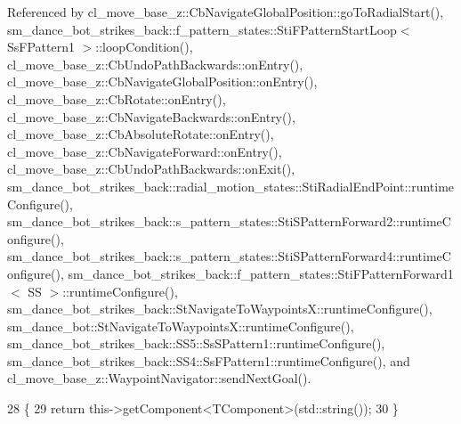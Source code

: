 Referenced by cl\+\_\+move\+\_\+base\+\_\+z\+::\+Cb\+Navigate\+Global\+Position\+::go\+To\+Radial\+Start(), sm\+\_\+dance\+\_\+bot\+\_\+strikes\+\_\+back\+::f\+\_\+pattern\+\_\+states\+::\+Sti\+F\+Pattern\+Start\+Loop$<$ Ss\+F\+Pattern1 $>$\+::loop\+Condition(), cl\+\_\+move\+\_\+base\+\_\+z\+::\+Cb\+Undo\+Path\+Backwards\+::on\+Entry(), cl\+\_\+move\+\_\+base\+\_\+z\+::\+Cb\+Navigate\+Global\+Position\+::on\+Entry(), cl\+\_\+move\+\_\+base\+\_\+z\+::\+Cb\+Rotate\+::on\+Entry(), cl\+\_\+move\+\_\+base\+\_\+z\+::\+Cb\+Navigate\+Backwards\+::on\+Entry(), cl\+\_\+move\+\_\+base\+\_\+z\+::\+Cb\+Absolute\+Rotate\+::on\+Entry(), cl\+\_\+move\+\_\+base\+\_\+z\+::\+Cb\+Navigate\+Forward\+::on\+Entry(), cl\+\_\+move\+\_\+base\+\_\+z\+::\+Cb\+Undo\+Path\+Backwards\+::on\+Exit(), sm\+\_\+dance\+\_\+bot\+\_\+strikes\+\_\+back\+::radial\+\_\+motion\+\_\+states\+::\+Sti\+Radial\+End\+Point\+::runtime\+Configure(), sm\+\_\+dance\+\_\+bot\+\_\+strikes\+\_\+back\+::s\+\_\+pattern\+\_\+states\+::\+Sti\+S\+Pattern\+Forward2\+::runtime\+Configure(), sm\+\_\+dance\+\_\+bot\+\_\+strikes\+\_\+back\+::s\+\_\+pattern\+\_\+states\+::\+Sti\+S\+Pattern\+Forward4\+::runtime\+Configure(), sm\+\_\+dance\+\_\+bot\+\_\+strikes\+\_\+back\+::f\+\_\+pattern\+\_\+states\+::\+Sti\+F\+Pattern\+Forward1$<$ S\+S $>$\+::runtime\+Configure(), sm\+\_\+dance\+\_\+bot\+\_\+strikes\+\_\+back\+::\+St\+Navigate\+To\+Waypoints\+X\+::runtime\+Configure(), sm\+\_\+dance\+\_\+bot\+::\+St\+Navigate\+To\+Waypoints\+X\+::runtime\+Configure(), sm\+\_\+dance\+\_\+bot\+\_\+strikes\+\_\+back\+::\+S\+S5\+::\+Ss\+S\+Pattern1\+::runtime\+Configure(), sm\+\_\+dance\+\_\+bot\+\_\+strikes\+\_\+back\+::\+S\+S4\+::\+Ss\+F\+Pattern1\+::runtime\+Configure(), and cl\+\_\+move\+\_\+base\+\_\+z\+::\+Waypoint\+Navigator\+::send\+Next\+Goal().


\begin{DoxyCode}
28 \{
29     \textcolor{keywordflow}{return} this->getComponent<TComponent>(std::string());
30 \}
\end{DoxyCode}


